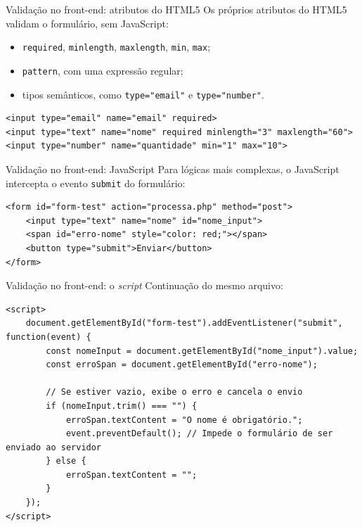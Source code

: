 \documentclass{beamer}
\begin{document}
\begin{frame}[fragile]{Validação no front-end: atributos do HTML5}
	Os próprios atributos do HTML5 validam o formulário, sem JavaScript:

	\begin{itemize}
		\item \texttt{required}, \texttt{minlength}, \texttt{maxlength},
		      \texttt{min}, \texttt{max};
		\item \texttt{pattern}, com uma expressão regular;
		\item tipos semânticos, como \texttt{type="email"} e
		      \texttt{type="number"}.
	\end{itemize}

	\begin{verbatim}
<input type="email" name="email" required>
<input type="text" name="nome" required minlength="3" maxlength="60">
<input type="number" name="quantidade" min="1" max="10">
	\end{verbatim}
\end{frame}

\begin{frame}[fragile]{Validação no front-end: JavaScript}
	Para lógicas mais complexas, o JavaScript intercepta o evento
	\texttt{submit} do formulário:

	\begin{verbatim}
<form id="form-test" action="processa.php" method="post">
    <input type="text" name="nome" id="nome_input">
    <span id="erro-nome" style="color: red;"></span>
    <button type="submit">Enviar</button>
</form>
	\end{verbatim}
\end{frame}

\begin{frame}[fragile]{Validação no front-end: o \emph{script}}
	Continuação do mesmo arquivo:

	\begin{verbatim}
<script>
    document.getElementById("form-test").addEventListener("submit", function(event) {
        const nomeInput = document.getElementById("nome_input").value;
        const erroSpan = document.getElementById("erro-nome");

        // Se estiver vazio, exibe o erro e cancela o envio
        if (nomeInput.trim() === "") {
            erroSpan.textContent = "O nome é obrigatório.";
            event.preventDefault(); // Impede o formulário de ser enviado ao servidor
        } else {
            erroSpan.textContent = "";
        }
    });
</script>
	\end{verbatim}
\end{frame}
\end{document}
